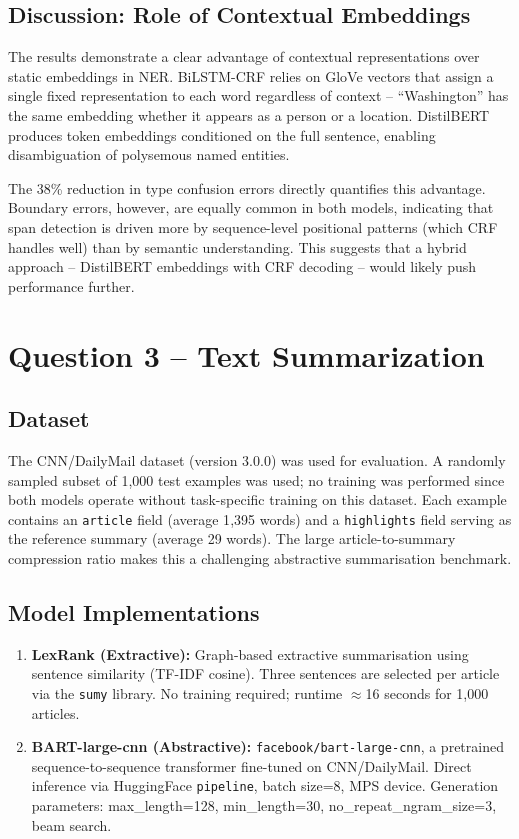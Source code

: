 \documentclass[11pt,a4paper]{article}
\begin{document}
\subsection{Discussion: Role of Contextual Embeddings}

The results demonstrate a clear advantage of contextual representations over static embeddings in NER. BiLSTM-CRF relies on GloVe vectors that assign a single fixed representation to each word regardless of context -- ``Washington'' has the same embedding whether it appears as a person or a location. DistilBERT produces token embeddings conditioned on the full sentence, enabling disambiguation of polysemous named entities.

The 38\% reduction in type confusion errors directly quantifies this advantage. Boundary errors, however, are equally common in both models, indicating that span detection is driven more by sequence-level positional patterns (which CRF handles well) than by semantic understanding. This suggests that a hybrid approach -- DistilBERT embeddings with CRF decoding -- would likely push performance further.

\section{Question 3 -- Text Summarization}

\subsection{Dataset}

The CNN/DailyMail dataset (version 3.0.0) was used for evaluation. A randomly sampled subset of 1{,}000 test examples was used; no training was performed since both models operate without task-specific training on this dataset. Each example contains an \texttt{article} field (average 1{,}395 words) and a \texttt{highlights} field serving as the reference summary (average 29 words). The large article-to-summary compression ratio makes this a challenging abstractive summarisation benchmark.

\subsection{Model Implementations}

\begin{enumerate}
    \item \textbf{LexRank (Extractive):} Graph-based extractive summarisation using sentence similarity (TF-IDF cosine). Three sentences are selected per article via the \texttt{sumy} library. No training required; runtime $\approx$16 seconds for 1{,}000 articles.

    \item \textbf{BART-large-cnn (Abstractive):} \texttt{facebook/bart-large-cnn}, a pretrained sequence-to-sequence transformer fine-tuned on CNN/DailyMail. Direct inference via HuggingFace \texttt{pipeline}, batch size=8, MPS device. Generation parameters: max\_length=128, min\_length=30, no\_repeat\_ngram\_size=3, beam search.
\end{enumerate}
\end{document}
